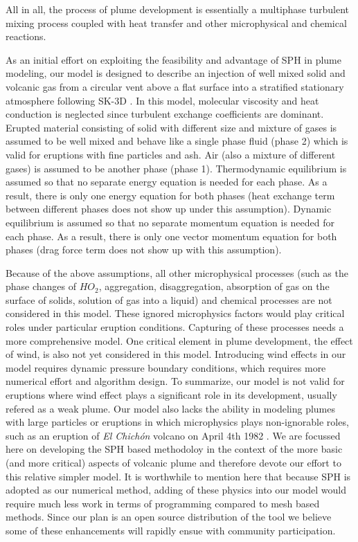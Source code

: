 All in all, the process of plume development is  essentially a multiphase turbulent mixing process coupled with heat transfer and other microphysical and chemical reactions.

As an initial effort on exploiting the feasibility and advantage of SPH in plume modeling, our model is designed to describe an injection of well mixed solid and volcanic gas from a circular vent above a flat surface into a stratified stationary atmosphere following SK-3D \citep{suzuki2005numerical}. In this model, molecular viscosity and heat conduction is neglected since turbulent exchange coefficients are dominant. Erupted material consisting of solid with different size and mixture of gases is assumed to be well mixed and behave like a single phase fluid (phase 2) which is valid for eruptions with fine particles and ash. Air (also a mixture of different gases) is assumed to be another phase (phase 1). Thermodynamic equilibrium is assumed so that no separate energy equation is needed for each phase. As a result, there is only one energy equation for both phases (heat exchange term between different phases does not show up under this assumption). Dynamic equilibrium is assumed so that no separate momentum equation is needed for each phase. As a result, there is only one vector momentum equation for both phases (drag force term does not show up with this assumption). 

Because of the above assumptions, all other microphysical processes (such as the phase changes of $HO_2$, aggregation, disaggregation, absorption of gas on the surface of solids, solution of gas into a liquid) and chemical processes are not considered in this model. These ignored microphysics factors would play critical roles under particular eruption conditions. Capturing of these processes needs a more comprehensive model. One critical element in plume development, the effect of wind, is also not yet considered in this model. Introducing wind effects in our model requires dynamic pressure boundary conditions, which requires more numerical effort and algorithm design. To summarize, our model is not valid for eruptions where wind effect plays a significant role in its development, usually refered as a weak plume. Our model also lacks the ability in modeling plumes with large particles or eruptions in which microphysics plays non-ignorable roles, such as an eruption of \textit{El Chich{\'o}n} volcano on April 4th 1982 \citep{sigurdsson19841982, folch2016fplume}. We are focussed here on developing the SPH based methodoloy in the context of the more basic (and more critical) aspects of volcanic plume and therefore devote our effort to this relative simpler model. It is worthwhile to mention here that because SPH is adopted as our numerical method, adding of these physics into our model would require much less work in terms of programming compared to mesh based methods. Since our plan is an open source distribution of the tool we believe some of these enhancements will rapidly ensue with community participation.

